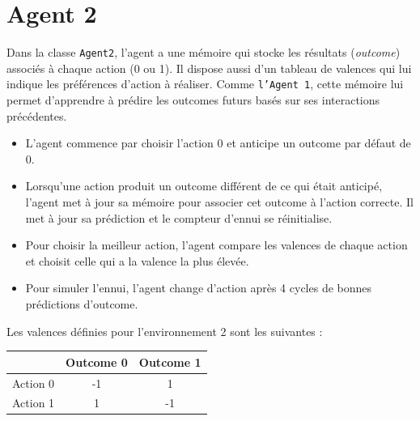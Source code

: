 \documentclass[a4paper, 12pt]{article}
\begin{document}
\vspace{-20pt} 

\section{Agent 2}

\hspace*{\parindent} Dans la classe \texttt{Agent2}, l'agent a une mémoire qui stocke les résultats (\textit{outcome}) associés à chaque action (0 ou 1). Il dispose aussi d'un tableau de valences qui lui indique les préférences d'action à réaliser. Comme \texttt{l'Agent 1}, cette mémoire lui permet d'apprendre à prédire les outcomes futurs basés sur ses interactions précédentes.

\begin{itemize}
    \item L'agent commence par choisir l'action 0 et anticipe un outcome par défaut de 0.
    \item Lorsqu'une action produit un outcome différent de ce qui était anticipé, l'agent met à jour sa mémoire pour associer cet outcome à l'action correcte. Il met à jour sa prédiction et le compteur d'ennui se réinitialise.
    \item Pour choisir la meilleur action, l'agent compare les valences de chaque action et choisit celle qui a la valence la plus élevée.
    \item Pour simuler l'ennui, l'agent change d'action après 4 cycles de bonnes prédictions d'outcome.
\end{itemize}

Les valences définies pour l'environnement 2 sont les suivantes :

\begin{center}
\begin{tabular}{|c|c|c|}
\hline
& Outcome 0 & Outcome 1 \\
\hline
Action 0 & -1 & 1 \\
\hline
Action 1 & 1 & -1 \\
\hline
\end{tabular}
\end{center}
\end{document}
